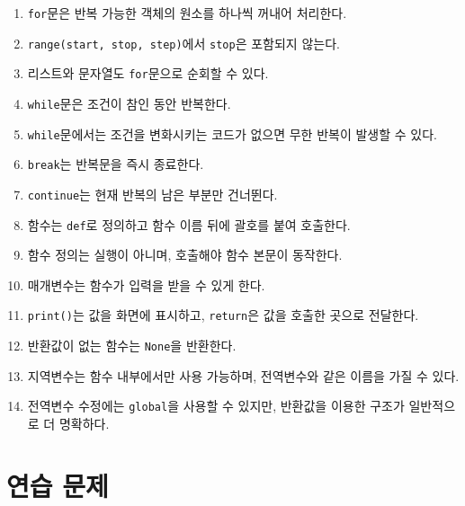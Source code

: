 \documentclass[11pt,a4paper]{article}
\begin{document}
\begin{enumerate}
    \item \texttt{for}문은 반복 가능한 객체의 원소를 하나씩 꺼내어 처리한다.
    \item \texttt{range(start, stop, step)}에서 \texttt{stop}은 포함되지 않는다.
    \item 리스트와 문자열도 \texttt{for}문으로 순회할 수 있다.
    \item \texttt{while}문은 조건이 참인 동안 반복한다.
    \item \texttt{while}문에서는 조건을 변화시키는 코드가 없으면 무한 반복이 발생할 수 있다.
    \item \texttt{break}는 반복문을 즉시 종료한다.
    \item \texttt{continue}는 현재 반복의 남은 부분만 건너뛴다.
    \item 함수는 \texttt{def}로 정의하고 함수 이름 뒤에 괄호를 붙여 호출한다.
    \item 함수 정의는 실행이 아니며, 호출해야 함수 본문이 동작한다.
    \item 매개변수는 함수가 입력을 받을 수 있게 한다.
    \item \texttt{print()}는 값을 화면에 표시하고, \texttt{return}은 값을 호출한 곳으로 전달한다.
    \item 반환값이 없는 함수는 \texttt{None}을 반환한다.
    \item 지역변수는 함수 내부에서만 사용 가능하며, 전역변수와 같은 이름을 가질 수 있다.
    \item 전역변수 수정에는 \texttt{global}을 사용할 수 있지만, 반환값을 이용한 구조가 일반적으로 더 명확하다.
\end{enumerate}

\section{연습 문제}
\end{document}
